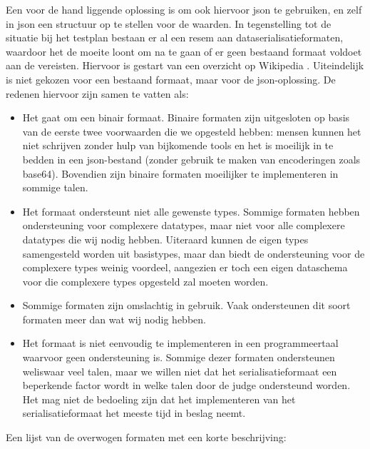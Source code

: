 Een voor de hand liggende oplossing is om ook hiervoor json te gebruiken, en zelf in json een structuur op te stellen voor de waarden.
In tegenstelling tot de situatie bij het testplan bestaan er al een resem aan dataserialisatieformaten, waardoor het de moeite loont om na te gaan of er geen bestaand formaat voldoet aan de vereisten.
Hiervoor is gestart van een overzicht op Wikipedia \autocite{wiki2020}.
Uiteindelijk is niet gekozen voor een bestaand formaat, maar voor de json-oplossing.
De redenen hiervoor zijn samen te vatten als:

\begin{itemize}
    \item Het gaat om een binair formaat.
    Binaire formaten zijn uitgesloten op basis van de eerste twee voorwaarden die we opgesteld hebben: mensen kunnen het niet schrijven zonder hulp van bijkomende tools en het is moeilijk in te bedden in een json-bestand (zonder gebruik te maken van encoderingen zoals base64).
    Bovendien zijn binaire formaten moeilijker te implementeren in sommige talen.
    \item Het formaat ondersteunt niet alle gewenste types.
    Sommige formaten hebben ondersteuning voor complexere datatypes, maar niet voor alle complexere datatypes die wij nodig hebben.
    Uiteraard kunnen de eigen types samengesteld worden uit basistypes, maar dan biedt de ondersteuning voor de complexere types weinig voordeel, aangezien er toch een eigen dataschema voor die complexere types opgesteld zal moeten worden.
    \item Sommige formaten zijn omslachtig in gebruik.
    Vaak ondersteunen dit soort formaten meer dan wat wij nodig hebben.
    \item Het formaat is niet eenvoudig te implementeren in een programmeertaal waarvoor geen ondersteuning is.
    Sommige dezer formaten ondersteunen weliswaar veel talen, maar we willen niet dat het serialisatieformaat een beperkende factor wordt in welke talen door de judge ondersteund worden.
    Het mag niet de bedoeling zijn dat het implementeren van het serialisatieformaat het meeste tijd in beslag neemt.
\end{itemize}

Een lijst van de overwogen formaten met een korte beschrijving:

